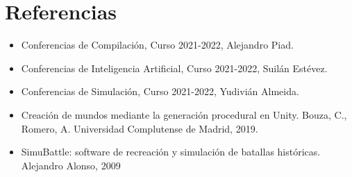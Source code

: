 \section{Referencias}

\begin{itemize}
    \item Conferencias de Compilación, Curso 2021-2022, Alejandro Piad.
    \item Conferencias de Inteligencia Artificial, Curso 2021-2022, Suilán Estévez.
    \item Conferencias de Simulación, Curso 2021-2022, Yudivián Almeida.
    \item Creación de mundos mediante la generación procedural en Unity. Bouza, C., Romero, A. Universidad Complutense de Madrid, 2019.
    \item SimuBattle: software de recreación y simulación de batallas históricas. Alejandro Alonso, 2009
\end{itemize}